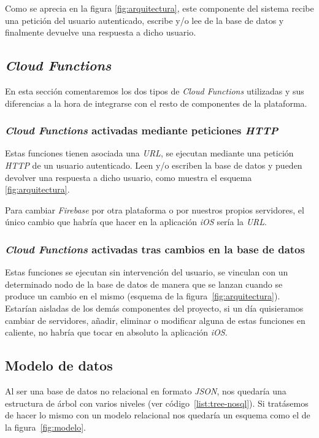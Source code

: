 Como se aprecia en la figura \ref{fig:arquitectura}, este componente del sistema recibe una petición del usuario autenticado, escribe y/o lee de la base de datos y finalmente devuelve una respuesta a dicho usuario.

\subsection{\textit{Cloud Functions}}\label{cloud:section}
En esta sección comentaremos los dos tipos de \textit{Cloud Functions} utilizadas y sus diferencias a la hora de integrarse con el resto de componentes de la plataforma.

\subsubsection*{\textit{Cloud Functions} activadas mediante peticiones \textit{HTTP}}
Estas funciones tienen asociada una \textit{URL}, se ejecutan mediante una petición \textit{HTTP} de un usuario autenticado. Leen y/o escriben la base de datos y pueden devolver una respuesta a dicho usuario, como muestra el esquema \ref{fig:arquitectura}.

Para cambiar \textit{Firebase} por otra plataforma o por nuestros propios servidores, el único cambio que habría que hacer en la aplicación \textit{iOS} sería la \textit{URL}.

\subsubsection*{\textit{Cloud Functions} activadas tras cambios en la base de datos}
Estas funciones se ejecutan sin intervención del usuario, se vinculan con un determinado nodo de la base de datos de manera que se lanzan cuando se produce un cambio en el mismo (esquema de la figura~\ref{fig:arquitectura}). Estarían aisladas de los demás componentes del proyecto, si un día quisieramos cambiar de servidores, añadir, eliminar o modificar alguna de estas funciones en caliente, no habría que tocar en absoluto la aplicación \textit{iOS}.

\subsection{Modelo de datos}
Al ser una base de datos no relacional en formato \textit{JSON}, nos quedaría una estructura de árbol con varios niveles (ver código~\ref{list:tree-nosql}). Si tratásemos de hacer lo mismo con un modelo relacional nos quedaría un esquema como el de la figura~\ref{fig:modelo}.


